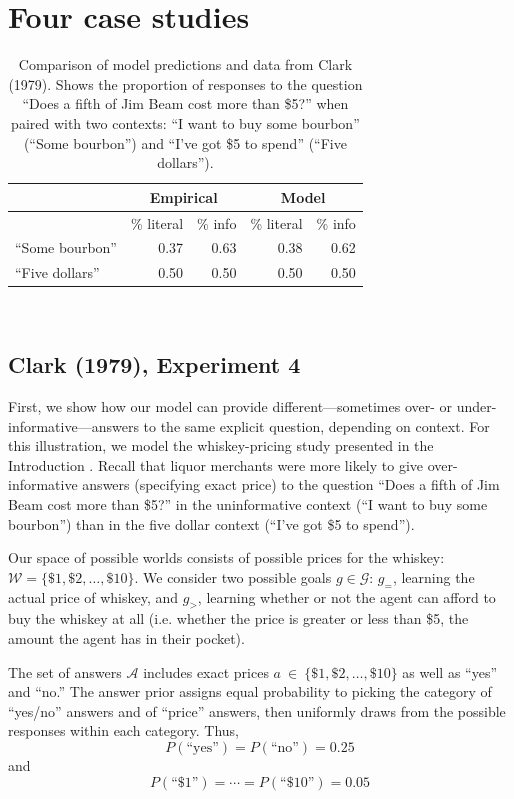 \documentclass[12pt, floatsintext, jou]{apa6}
\begin{document}
\section{Four case studies}

\begin{table}[t]
\centering
\begin{tabular}{ p{3cm} | r | r ||||||  r | r }
& \multicolumn{2}{c||||||}{Empirical} & \multicolumn{2}{c}{Model} \\
\hline
&           \% literal &   \%  info &           \% literal &   \%  info    \\
\hline
``Some bourbon'' &   0.37 & 0.63 &  0.38 & 0.62 \\
\hline
``Five dollars''     & 0.50 & 0.50 & 0.50 & 0.50 \\
\end{tabular}
\\[1.5pt]
\caption{Comparison of model predictions and data from Clark (1979). Shows the proportion of responses to the question ``Does a fifth of Jim Beam cost more than \$5?'' when paired with two contexts: ``I want to buy some bourbon'' (``Some bourbon'') and ``I've got \$5 to spend'' (``Five dollars''). } 
\label{table:clark79exp4}
\end{table}

\subsection{Clark (1979), Experiment 4}
First, we show how our model can provide different---sometimes over- or under-informative---answers to the same explicit question, depending on context. For this illustration, we model the whiskey-pricing study presented in the Introduction \cite{Clark79_IndirectSpeechActs}. Recall that liquor merchants were more likely to give over-informative answers (specifying exact price) to the question ``Does a fifth of Jim Beam cost more than \$5?'' in the uninformative context (``I want to buy some bourbon'') than in the five dollar context (``I've got \$5 to spend'').

Our space of possible worlds consists of possible prices for the whiskey: $\mathcal{W} = \{\$1, \$2, \dots, \$10\}$. We consider two possible goals $g \in \mathcal{G}$: $g_=$, learning the actual price of whiskey,  and $g_>$, learning whether or not the agent can afford to buy the whiskey at all (i.e. whether the price is greater or less than \$5, the amount the agent has in their pocket). 

The set of answers $\mathcal{A}$ includes exact prices $a~\in~\{\$1, \$2, \dots, \$10\}$ as well as ``yes'' and ``no.'' The answer prior assigns equal probability to picking the category of ``yes/no'' answers and of ``price'' answers, then uniformly draws from the possible responses within each category. Thus, $$P(\textrm{``yes''}) = P(\textrm{``no''}) = 0.25$$ and $$P(\textrm{``\$1''}) = \cdots = P(\textrm{``\$10''}) = 0.05$$
\end{document}
